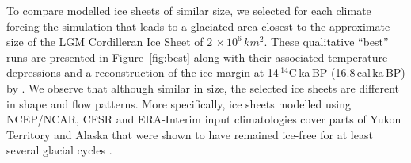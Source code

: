 To compare modelled ice sheets of similar size, we selected for each climate forcing the simulation that leads to a glaciated area closest to the approximate size of the LGM Cordilleran Ice Sheet of $2\,\times10^6\,\unit{km^2}$. These qualitative ``best'' runs are presented in Figure~\ref{fig:best} along with their associated temperature depressions and a reconstruction of the ice margin at 14\,$^{14}$C\,ka\,BP (16.8\,cal\,ka\,BP) by \citet{dyke-2004}. We observe that although similar in size, the selected ice sheets are different in shape and flow patterns. More specifically, ice sheets modelled using NCEP/NCAR, CFSR and ERA-Interim input climatologies cover parts of Yukon Territory and Alaska that were shown to have remained ice-free for at least several glacial cycles \citep{dukrodkin-1999,kaufman-manley-2004}.
